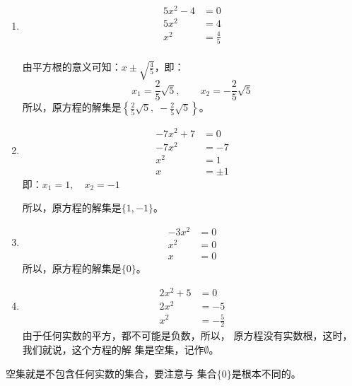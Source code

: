 \begin{solution}
\begin{enumerate}
    \item 
    \begin{align*}
        5x^2-4&=0\\
        5x^2&=4\tag{移项}\\
        x^2&=\frac{4}{5} \tag{两边除以5}\\
    \end{align*}

    由平方根的意义可知：$x\pm\sqrt{\frac{4}{5}}$，即：
\[ x_1=\frac{2}{5}\sqrt{5},\qquad x_2=-\frac{2}{5}\sqrt{5} \]
所以，原方程的解集是$\left\{\frac{2}{5}\sqrt{5},\; -\frac{2}{5}\sqrt{5}\right\}$。

\item \begin{align*}
    -7x^2+7&=0\\
    -7x^2&=-7\tag{移项变号}\\
    x^2&=1\tag{两边除以$-7$}\\
    x&=\pm 1 \tag{平方根的意义}
\end{align*}
即：$x_1=1,\quad x_2=-1$

所以，原方程的解集是$\{1,-1\}$。

\item \begin{align*}
    -3x^2&=0\\
    x^2&=0 \tag{两边除以$-3$}\\
    x&=0
\end{align*}
所以，原方程的解集是$\{0\}$。

\item \begin{align*}
    2x^2+5&=0\\
2x^2&=-5  \tag{移项变号}\\
x^2&=-\frac{5}{2} \tag{两边除以2}
\end{align*}
由于任何实数的平方，都不可能是负数，所以，
原方程没有实数根，这时，我们就说，这个方程的解
集是空集，记作$\emptyset$。
\end{enumerate}
\end{solution}

\begin{rmk}
    空集就是不包含任何实数的集合，要注意与
集合$\{0\}$是根本不同的。
\end{rmk}

